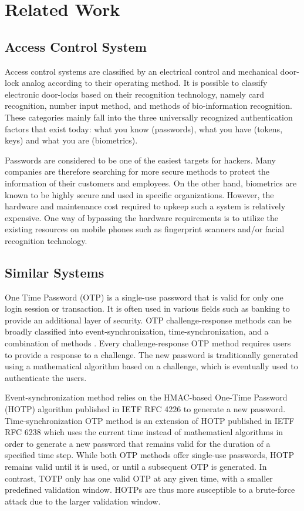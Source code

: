 \documentclass[conference]{IEEEtran}
\begin{document}
\section{Related Work}
\subsection{Access Control System}
	Access control systems are classified by an electrical control and mechanical door-lock analog according to their operating method. It is possible to classify electronic door-locks based on their recognition technology, namely card recognition, number input method, and methods of bio-information recognition. These categories mainly fall into the three universally recognized authentication factors that exist today: what you know (passwords), what you have (tokens, keys) and what you are (biometrics). 
	
Passwords are considered to be one of the easiest targets for hackers. Many companies are therefore searching for more secure methods to protect the information of their customers and employees. On the other hand, biometrics are known to be highly secure and used in specific organizations. However, the hardware and maintenance cost required to upkeep such a system is relatively expensive. One way of bypassing the hardware requirements is to utilize the existing resources on mobile phones such as fingerprint scanners and/or facial recognition technology.

\subsection{Similar Systems}
	One Time Password (OTP) is a single-use password that is valid for only one login session or transaction. It is often used in various fields such as banking to provide an additional layer of security. OTP challenge-response methods can be broadly classified into event-synchronization, time-synchronization, and a combination of methods \cite{ab4,ab5}. Every challenge-response OTP method requires users to provide a response to a challenge. The new password is traditionally generated using a mathematical algorithm based on a challenge, which is eventually used to authenticate the users.
	
	Event-synchronization method relies on the HMAC-based One-Time Password (HOTP) algorithm published in IETF RFC 4226 \cite{ab6} to generate a new password. Time-synchronization OTP method is an extension of HOTP published in IETF RFC 6238 \cite{ab7} which uses the current time instead of mathematical algorithms in order to generate a new password that remains valid for the duration of a specified time step. While both OTP methods offer single-use passwords, HOTP remains valid until it is used, or until a subsequent OTP is generated. In contrast, TOTP only has one valid OTP at any given time, with a smaller predefined validation window. HOTPs are thus more susceptible to a brute-force attack due to the larger validation window.
	
\end{document}
